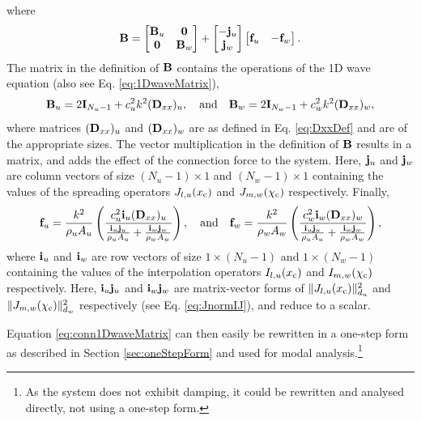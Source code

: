where 
\begin{equation*}
    \mathbf{B} = \begin{bmatrix}
        \mathbf{B}_u & \mathbf{0}\\
        \mathbf{0} & \mathbf{B}_w 
    \end{bmatrix} + \begin{bmatrix}
        -\mathbf{j}_u\\
        \mathbf{j}_w
    \end{bmatrix}
    \begin{bmatrix}
        \mathbf{f}_u& -\mathbf{f}_w
    \end{bmatrix}.
\end{equation*}
The matrix in the definition of $\mathbf{B}$ contains the operations of the 1D wave equation (also see Eq. \eqref{eq:1DwaveMatrix}),
\begin{equation}    
    \mathbf{B}_u = 2\mathbf{I}_{N_u-1} +c_u^2k^2 (\mathbf{D}_{xx})_u, \quad \text{and} \quad \mathbf{B}_w = 2\mathbf{I}_{N_w-1} +c_w^2k^2 (\mathbf{D}_{xx})_w,
\end{equation}
where matrices $(\mathbf{D}_{xx})_u$ and $(\mathbf{D}_{xx})_w$ are as defined in Eq. \eqref{eq:DxxDef} and are of the appropriate sizes. The vector multiplication in the definition of $\mathbf{B}$ results in a matrix, and adds the effect of the connection force to the system. Here, $\mathbf{j}_u$ and $\mathbf{j}_w$ are column vectors of size $(N_u-1)\times 1$ and $(N_w-1)\times 1$ containing the values of the spreading operators $J_{l, u}(x_{\text{c}})$ and $J_{m, w}(\chi_{\text{c}})$ respectively. Finally,
\begin{equation*}
    \mathbf{f}_u = \frac{k^2}{\rho_uA_u} \left(\frac{c_u^2\mathbf{i}_u(\mathbf{D}_{xx})_u}{\frac{\mathbf{i}_u \mathbf{j}_u}{ \rho_u A_u} + \frac{\mathbf{i}_w \mathbf{j}_w}{\rho_w A_w}}\right), \quad \text{and} \quad \mathbf{f}_w =  \frac{k^2}{\rho_wA_w}\left(\frac{c_w^2 \mathbf{i}_w(\mathbf{D}_{xx})_w}{\frac{\mathbf{i}_u \mathbf{j}_u}{ \rho_u A_u} + \frac{\mathbf{i}_w \mathbf{j}_w}{\rho_w A_w}}\right),
\end{equation*}
where $\mathbf{i}_u$ and $\mathbf{i}_w$ are row vectors of size $1\times (N_u-1)$ and $1\times (N_w-1)$ containing the values of the interpolation operators $I_{l, u}(x_{\text{c}})$ and $I_{m, w}(\chi_{\text{c}})$ respectively. Here, $\mathbf{i}_u\mathbf{j}_u$ and $\mathbf{i}_w\mathbf{j}_w$ are matrix-vector forms of $\lVert J_{l, u}(x_{\text{c}})\rVert_{d_u}^2$ and $\lVert J_{m, w}(\chi_{\text{c}})\rVert_{d_w}^2$ respectively (see Eq. \eqref{eq:JnormIJ}), and reduce to a scalar.

Equation \eqref{eq:conn1DwaveMatrix} can then easily be rewritten in a one-step form as described in Section \ref{sec:oneStepForm} and used for modal analysis.\footnote{As the system does not exhibit damping, it could be rewritten and analysed directly, not using a one-step form.}

